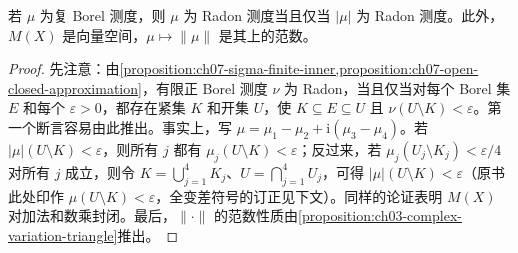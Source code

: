 \documentclass[../../main.tex]{subfiles}
\begin{document}
\begin{proposition}\label{proposition:ch07-variation-radon}
若 $\mu$ 为复 Borel 测度，则 $\mu$ 为 Radon 测度当且仅当 $|\mu|$ 为 Radon 测度。此外，$M(X)$ 是向量空间，$\mu\mapsto\|\mu\|$ 是其上的范数。
\end{proposition}
\begin{proof}
先注意：由\cref{proposition:ch07-sigma-finite-inner,proposition:ch07-open-closed-approximation}，有限正 Borel 测度 $\nu$ 为 Radon，当且仅当对每个 Borel 集 $E$ 和每个 $\varepsilon>0$，都存在紧集 $K$ 和开集 $U$，使 $K\subseteq E\subseteq U$ 且 $\nu(U\setminus K)<\varepsilon$。第一个断言容易由此推出。事实上，写 $\mu=\mu_1-\mu_2+\mathrm i(\mu_3-\mu_4)$。若 $|\mu|(U\setminus K)<\varepsilon$，则所有 $j$ 都有 $\mu_j(U\setminus K)<\varepsilon$；反过来，若 $\mu_j(U_j\setminus K_j)<\varepsilon/4$ 对所有 $j$ 成立，则令 $K=\bigcup_{j=1}^4K_j$、$U=\bigcap_{j=1}^4U_j$，可得 $|\mu|(U\setminus K)<\varepsilon$（原书此处印作 $\mu(U\setminus K)<\varepsilon$，全变差符号的订正见下文）。同样的论证表明 $M(X)$ 对加法和数乘封闭。最后，$\|\cdot\|$ 的范数性质由\cref{proposition:ch03-complex-variation-triangle}推出。
\end{proof}
\end{document}
